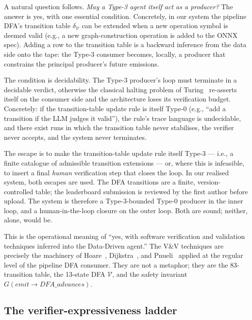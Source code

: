 A natural question follows.  \emph{May a Type-3 agent itself act
as a producer?}  The answer is yes, with one essential condition.
Concretely, in our system the pipeline DFA's transition table
$\delta_\mathcal{V}$ can be extended when a new operation symbol
is deemed valid (e.g., a new graph-construction operation is added
to the ONNX spec).  Adding a row to the transition table is
a backward inference from the data side onto the tape: the Type-3
consumer becomes, locally, a producer that constrains the
principal producer's future emissions.

The condition is decidability.  The Type-3 producer's loop must
terminate in a decidable verdict, otherwise the classical
halting problem of Turing~\cite{turing1936computable}
re-asserts itself on the consumer side and the architecture
loses its verification budget.  Concretely: if the
transition-table update rule is itself Type-0 (e.g., ``add a
transition if the LLM judges it valid''), the rule's trace
language is undecidable, and there exist runs in which the
transition table never stabilises, the verifier never accepts,
and the system never terminates.

The escape is to make the transition-table update rule itself
Type-3 --- i.e., a finite catalogue of admissible transition
extensions --- or, where this is infeasible, to insert a final
\emph{human} verification step that closes the loop.  In our
realised system, both escapes are used.  The DFA transitions
are a finite, version-controlled table; the leaderboard
submission is reviewed by the first author before upload.
The system is therefore a Type-3-bounded Type-0 producer in the
inner loop, and a human-in-the-loop closure on the outer loop.
Both are sound; neither, alone, would be.

This is the operational meaning of ``yes, with software
verification and validation techniques inferred into the
Data-Driven agent.''  The V\&V techniques are precisely the
machinery of Hoare~\cite{hoare1969axiomatic},
Dijkstra~\cite{dijkstra1975guarded}, and
Pnueli~\cite{pnueli1977temporal}
applied at the regular level of the pipeline DFA consumer.
They are not a metaphor; they are the 83-transition table, the
13-state DFA $\mathcal{V}$, and the safety invariant
$G(\mathit{emit} \rightarrow \mathit{DFA\_advances})$.

\subsection{The verifier-expressiveness ladder}
\label{sec:verifier-ladder}


